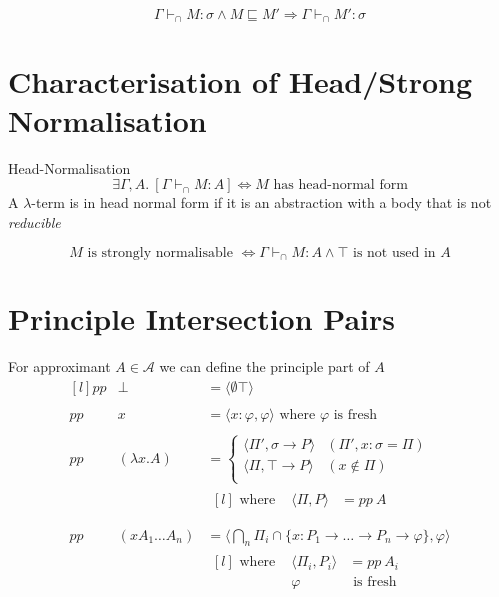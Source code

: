 \[\Gamma \vdash_\cap M : \sigma \land M \sqsubseteq M' \Rightarrow \Gamma \vdash_\cap M' : \sigma\]

\section{Characterisation of Head/Strong Normalisation}
\begin{definitionbox}{Head-Normalisation}
	\[\exists \Gamma, A . \ [\Gamma \vdash_\cap M : A] \Leftrightarrow M \text{ has head-normal form}\]
	A $\lambda$-term is in head normal form if it is an abstraction with a body that is not \textit{reducible}
\end{definitionbox}
\[M \text{ is strongly normalisable } \Leftrightarrow \Gamma \vdash_\cap M : A \land \top \text{ is not used in } A\]

\section{Principle Intersection Pairs}
For approximant $A \in \mathcal{A}$ we can define the principle part of $A$
\[\begin{matrix*}[l]
		pp & \bot & = \langle \emptyset \top \rangle \\
		\\
		pp & x & = \langle x : \varphi , \varphi \rangle \text{ where $\varphi$ is fresh}\\
		\\
		pp & (\lambda x . A) & = \begin{cases}
			\langle \Pi', \sigma \to P \rangle & (\Pi',x:\sigma = \Pi) \\
			\langle \Pi, \top \to P \rangle    & (x \not\in \Pi)       \\
		\end{cases} \\
		& & \begin{matrix*}[l]
			\text{ where } & \langle \Pi, P \rangle & = pp \ A \\
		\end{matrix*} \\
		\\
		pp & (x A_1 \dots A_n) & = \langle \bigcap_n\Pi_i \cap \{x: P_1 \to \dots \to P_n \to \varphi\}, \varphi \rangle \\
		& & \begin{matrix*}[l]
			\text{ where } & \langle \Pi_i, P_i \rangle & = pp \ A_i \\
			& \varphi & \text{ is fresh} \\
		\end{matrix*} \\
	\end{matrix*}\]
